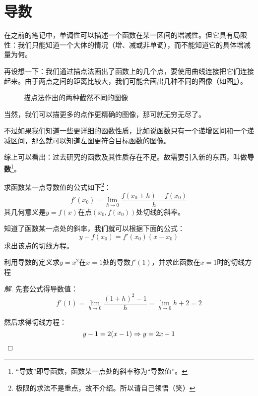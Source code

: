 \section{导数}
在之前的笔记中，单调性可以描述一个函数在某一区间的增减性。但它具有局限性：我们只能知道一个大体的情况（增、减或非单调），而不能知道它的具体增减量为何。

再设想一下：我们通过描点法画出了函数上的几个点，要使用曲线连接把它们连接起来。由于两点之间的距离比较大，我们可能会画出几种不同的图像（如图\ref{fig:two-different-function-figure}）。

\begin{figure}[htb]
    \centering
    \caption{描点法作出的两种截然不同的图像}
    \label{fig:two-different-function-figure}
\end{figure}

当然，我们可以描更多的点作更精确的图像，那可就无穷无尽了。

不过如果我们知道一些更详细的函数性质，比如说函数只有一个递增区间和一个递减区间，那么就可以知道左图更符合目标函数的图像。

综上可以看出：过去研究的函数及其性质存在不足。故需要引入新的东西，叫做\textbf{导数}\footnote{“导数”即导函数，函数某一点处的斜率称为“导数值”。}。

求函数某一点导数值的公式如下\footnote{极限的求法不是重点，故不介绍。所以请自己领悟（笑）}：\[f'(x_0)=\lim_{h\rightarrow 0}\frac{f(x_0+h)-f(x_0)}{h}\]其几何意义是$y=f(x)$在点$(x_0, f(x_0))$处切线的斜率。

知道了函数某一点处的斜率，我们就可以根据下面的公式：\[y-f(x_0)=f'(x_0)(x-x_0)\]求出该点的切线方程。

\begin{example}
	利用导数的定义求$y=x^2$在$x=1$处的导数$f'(1)$，并求此函数在$x=1$时的切线方程
\end{example}
\begin{proof}[解]
	先套公式得导数值：\[f'(1)=\lim_{h\rightarrow 0}\frac{(1+h)^2-1}{h}=\lim_{h\rightarrow 0}h+2=2\]

	然后求得切线方程：\[y-1=2(x-1)\Rightarrow y=2x-1\qedhere\]
\end{proof}

